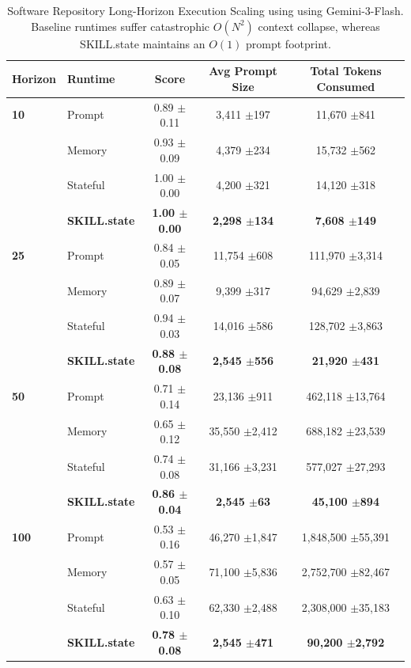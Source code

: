 \documentclass[11pt]{article}
\begin{document}
\begin{table}[t]
\centering
\caption{Software Repository Long-Horizon Execution Scaling using using Gemini-3-Flash. Baseline runtimes suffer catastrophic $O(N^2)$ context collapse, whereas SKILL.state maintains an $O(1)$ prompt footprint.}
\label{tab:env2_scaling_vertical_wide}
\begin{tabular*}{\textwidth}{@{\extracolsep{\fill}}llccc@{}}
\toprule
\textbf{Horizon} & \textbf{Runtime} & \textbf{Score} & \textbf{Avg Prompt Size} & \textbf{Total Tokens Consumed} \\
\midrule
\textbf{10} & Prompt & 0.89 \tiny{$\pm$0.11} & 3,411 \tiny{$\pm$197} & 11,670 \tiny{$\pm$841} \\
& Memory & 0.93 \tiny{$\pm$0.09} & 4,379 \tiny{$\pm$234} & 15,732 \tiny{$\pm$562} \\
& Stateful & 1.00 \tiny{$\pm$0.00} & 4,200 \tiny{$\pm$321} & 14,120 \tiny{$\pm$318} \\
& \textbf{SKILL.state} & \textbf{1.00 \tiny{$\pm$0.00}} & \textbf{2,298 \tiny{$\pm$134}} & \textbf{7,608 \tiny{$\pm$149}} \\
\midrule
\textbf{25} & Prompt & 0.84 \tiny{$\pm$0.05} & 11,754 \tiny{$\pm$608} & 111,970 \tiny{$\pm$3,314} \\
& Memory & 0.89 \tiny{$\pm$0.07} & 9,399 \tiny{$\pm$317} & 94,629 \tiny{$\pm$2,839} \\
& Stateful & 0.94 \tiny{$\pm$0.03} & 14,016 \tiny{$\pm$586} & 128,702 \tiny{$\pm$3,863} \\
& \textbf{SKILL.state} & \textbf{0.88 \tiny{$\pm$0.08}} & \textbf{2,545 \tiny{$\pm$556}} & \textbf{21,920 \tiny{$\pm$431}} \\
\midrule
\textbf{50} & Prompt & 0.71 \tiny{$\pm$0.14} & 23,136 \tiny{$\pm$911} & 462,118 \tiny{$\pm$13,764} \\
& Memory & 0.65 \tiny{$\pm$0.12} & 35,550 \tiny{$\pm$2,412} & 688,182 \tiny{$\pm$23,539} \\
& Stateful & 0.74 \tiny{$\pm$0.08} & 31,166 \tiny{$\pm$3,231} & 577,027 \tiny{$\pm$27,293} \\
& \textbf{SKILL.state} & \textbf{0.86 \tiny{$\pm$0.04}} & \textbf{2,545 \tiny{$\pm$63}} & \textbf{45,100 \tiny{$\pm$894}} \\
\midrule
\textbf{100} & Prompt & 0.53 \tiny{$\pm$0.16} & 46,270 \tiny{$\pm$1,847} & 1,848,500 \tiny{$\pm$55,391} \\
& Memory & 0.57 \tiny{$\pm$0.05} & 71,100 \tiny{$\pm$5,836} & 2,752,700 \tiny{$\pm$82,467} \\
& Stateful & 0.63 \tiny{$\pm$0.10} & 62,330 \tiny{$\pm$2,488} & 2,308,000 \tiny{$\pm$35,183} \\
& \textbf{SKILL.state} & \textbf{0.78 \tiny{$\pm$0.08}} & \textbf{2,545 \tiny{$\pm$471}} & \textbf{90,200 \tiny{$\pm$2,792}} \\
\bottomrule
\end{tabular*}
\end{table}
\end{document}
